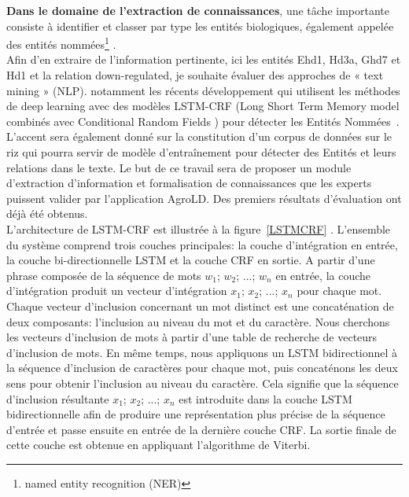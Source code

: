 \textbf{Dans le domaine de l’extraction de connaissances}, une tâche importante consiste à identifier et classer par type les entités biologiques, également appelée des entités nommées\footnote{named entity recognition (NER)} .\\

Afin d’en extraire de l’information pertinente, ici les entités Ehd1, Hd3a, Ghd7 et Hd1 et la relation down-regulated, je souhaite évaluer des approches de « text mining » (NLP). notamment les récents développement qui utilisent les méthodes de deep learning avec des modèles LSTM-CRF (Long Short Term Memory model combinés avec Conditional Random Fields ) pour détecter les Entités Nommées~\cite{Habibi2017a,Basaldella2017}. L’accent sera également donné sur la constitution d’un corpus de données sur le riz qui pourra servir de modèle d’entraînement pour détecter des Entités et leurs relations dans le texte. Le but de ce travail sera de proposer un module d'extraction d’information et formalisation de connaissances que les experts puissent valider par l’application AgroLD. Des premiers résultats d'évaluation ont déjà été obtenus.\\

L'architecture de LSTM-CRF est illustrée à la figure~\ref{LSTMCRF} \cite{Habibi2017a}. L'ensemble du système comprend trois couches principales: la couche d'intégration en entrée, la couche bi-directionnelle LSTM et la couche CRF en sortie. A partir d'une phrase composée de la séquence de mots $ w_ {1} $; $ w_ {2} $; ...; $ w_ {n} $ en entrée, la couche d'intégration produit un vecteur d'intégration $ x_ {1} $; $ x_ {2} $; ...; $ x_ {n} $ pour chaque mot. Chaque vecteur d'inclusion concernant un mot distinct est une concaténation de deux composants: l'inclusion au niveau du mot et du caractère. Nous cherchons les vecteurs d'inclusion de mots à partir d’une table de recherche de vecteurs d'inclusion de mots. En même temps, nous appliquons un LSTM bidirectionnel à la séquence d'inclusion de caractères pour chaque mot, puis concaténons les deux sens pour obtenir l'inclusion au niveau du caractère. Cela signifie que la séquence d'inclusion résultante  $ x_ {1} $; $ x_ {2} $; ...; $ x_ {n} $ est introduite dans la couche LSTM bidirectionnelle afin de produire une représentation plus précise de la séquence d'entrée et passe ensuite en entrée de la dernière couche CRF. La sortie finale de cette couche est obtenue en appliquant l'algorithme de Viterbi. 

